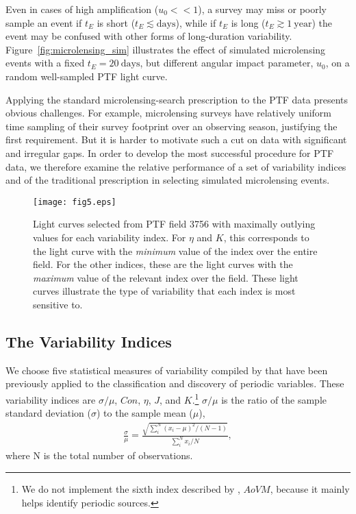 \documentclass{emulateapj}
\begin{document}
Even in cases of high amplification ($u_0<<1$), a survey may miss or poorly sample an event if $t_E$ is short ($t_E \lesssim\mathrm{days}$), while if $t_E$ is long ($t_E \gtrsim 1~\mathrm{year}$) the event may be confused with other forms of long-duration variability. Figure~\ref{fig:microlensing_sim} illustrates the effect of simulated microlensing events with a fixed $t_E=20~\mathrm{days}$, but different angular impact parameter, $u_0$, on a random well-sampled PTF light curve. 

Applying the standard microlensing-search prescription to the PTF data presents obvious challenges. For example, microlensing surveys have relatively uniform time sampling of their survey footprint over an observing season, justifying the first requirement. But it is harder to motivate such a cut on data with significant and irregular gaps. In order to develop the most successful procedure for PTF data, we therefore examine the relative performance of a set of variability indices and of the traditional prescription in selecting simulated microlensing events.

\begin{figure}[h]
\centering\texttt{[image: fig5.eps]}
\caption{Light curves selected from PTF field 3756 with maximally outlying values for each variability index. For $\eta$ and $K$, this corresponds to the light curve with the \emph{minimum} value of the index over the entire field. For the other indices, these are the light curves with the \emph{maximum} value of the relevant index over the field. These light curves illustrate the type of variability that each index is most sensitive to. } \label{fig:indices_examples}
\end{figure}

\subsection{The Variability Indices} 
We choose five statistical measures of variability compiled by \cite{shin2009} that have been previously applied to the classification and discovery of periodic variables. These variability indices are $\sigma/\mu$, $Con$, $\eta$, $J$, and $K$.\footnote{We do not implement the sixth index described by \cite{shin2009}, $AoVM$, because it mainly helps identify periodic sources.} $\sigma/\mu$ is the ratio of the sample standard deviation ($\sigma$) to the sample mean ($\mu$), 
\begin{align}
	\frac{\sigma}{\mu} = \frac{\sqrt{\sum^N_i (x_i - \mu)^2 / (N-1)}}{\sum^N_i x_i/N},
\end{align}
where N is the total number of observations. 
\end{document}
